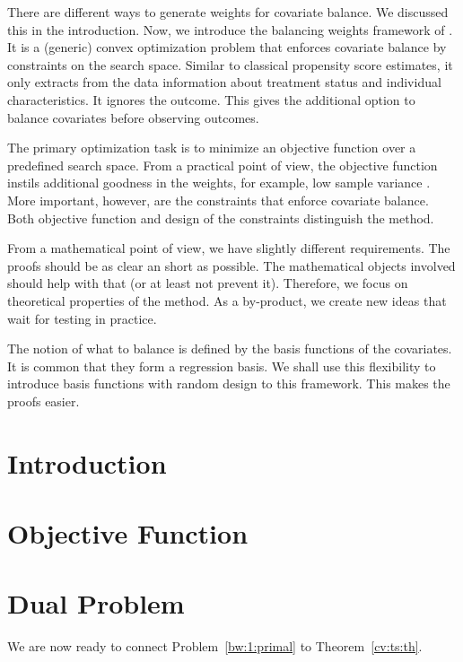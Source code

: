 There are different ways
to generate weights for covariate balance.
%
We discussed this in the introduction.
%
Now, we introduce the balancing weights framework of \cite{Wang2019}.
%
It is a (generic) convex optimization problem
that enforces covariate balance by constraints on the search space.
%
Similar to classical propensity score estimates, it only
extracts from the data information about treatment status and individual characteristics.
%
It ignores the outcome.
%
This gives the additional option to balance covariates before observing outcomes.

%
The primary optimization task is to minimize an objective function
over a predefined search space.
%
From a practical point of view, the objective function
instils additional goodness in the weights, 
for example, 
low sample variance \cite[Introduction]{Zubizarreta2015}. 
%
%
More important, however, are the constraints that enforce covariate balance.
%
Both objective function and design of the constraints distinguish the method.
%

From a mathematical point of view,
we have slightly different requirements.
%
The proofs should be as clear an short as possible.
%
The mathematical objects involved should help with that
(or at least not prevent it).
%
Therefore, we focus on theoretical properties
of the method.
%
As a by-product, we create new ideas that wait for testing in practice.

%
The notion of what to balance is defined by the basis functions of the covariates.
%
It is common that they form a regression basis.
%
We shall use this flexibility to introduce basis functions with random design to this framework.
%
This makes the proofs easier.
\section{Introduction}


\section{Objective Function}


\newpage 
\section{Dual Problem}
We are now ready to connect 
Problem~\ref{bw:1:primal} to Theorem~\ref{cv:ts:th}.


